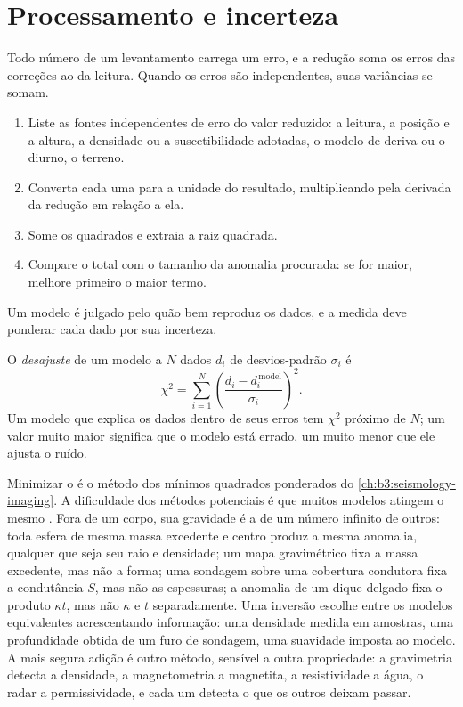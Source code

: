 \section{Processamento e incerteza}\label{sec:b3:field-lab-methods-3:processing}

Todo número de um levantamento carrega um erro, e a redução soma os
erros das correções ao da leitura. Quando os erros são
independentes, suas variâncias se somam.

\begin{method}\label{met:b3:field-lab-methods-3:budget}
\begin{enumerate}
  \item Liste as fontes independentes de erro do valor reduzido: a
        leitura, a posição e a altura, a densidade ou a suscetibilidade
        adotadas, o modelo de deriva ou o diurno, o terreno.
  \item Converta cada uma para a unidade do resultado, multiplicando pela
        derivada da redução em relação a ela.
  \item Some os quadrados e extraia a raiz quadrada.
  \item Compare o total com o tamanho da anomalia procurada: se for
        maior, melhore primeiro o maior termo.
\end{enumerate}
\end{method}

Um modelo é julgado pelo quão bem reproduz os dados, e a medida
deve ponderar cada dado por sua incerteza.

\begin{definition}\label{def:b3:field-lab-methods-3:inversion-practice}
O \emph{desajuste} de um modelo a $N$ dados $d_i$ de
desvios-padrão $\sigma_i$ é
\[
\chi^2 = \sum_{i=1}^N\left(\frac{d_i - d_i^{\,\mathrm{model}}}{\sigma_i}\right)^2 .
\]
Um modelo que explica os dados dentro de seus erros tem $\chi^2$ próximo
de $N$; um valor muito maior significa que o modelo está errado, um muito menor
que ele ajusta o ruído.
\end{definition}

Minimizar o  é o método dos mínimos quadrados ponderados
do \cref{ch:b3:seismology-imaging}. A dificuldade dos métodos potenciais
é que muitos modelos atingem o mesmo . Fora de um corpo, sua
gravidade é a de um número infinito de outros: toda esfera de mesma
massa excedente e centro produz a mesma anomalia, qualquer que seja seu raio e
densidade; um mapa gravimétrico fixa a massa excedente, mas não a forma; uma
sondagem sobre uma cobertura condutora fixa a condutância $S$, mas não as
espessuras; a anomalia de um dique delgado fixa o produto $\kappa t$,
mas não $\kappa$ e $t$ separadamente. Uma inversão escolhe entre os
modelos equivalentes acrescentando informação: uma densidade medida em amostras,
uma profundidade obtida de um furo de sondagem, uma suavidade imposta ao modelo. A mais segura
adição é outro método, sensível a outra propriedade: a gravimetria
detecta a densidade, a magnetometria a magnetita, a resistividade a água, o radar a permissividade, e
cada um detecta o que os outros deixam passar.

